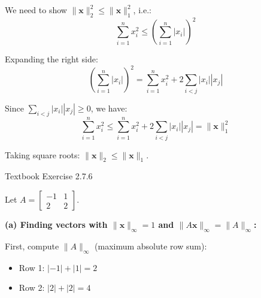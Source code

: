 \documentclass[reqno, answers]{exam}
\begin{document}
\begin{questions}
\begin{solution}
We need to show $\|\mathbf{x}\|_2^2 \leq \|\mathbf{x}\|_1^2$, i.e.:
\[
\sum_{i=1}^n x_i^2 \leq \left(\sum_{i=1}^n |x_i|\right)^2
\]

Expanding the right side:
\[
\left(\sum_{i=1}^n |x_i|\right)^2 = \sum_{i=1}^n x_i^2 + 2\sum_{i < j} |x_i||x_j|
\]

Since $\sum_{i < j} |x_i||x_j| \geq 0$, we have:
\[
\sum_{i=1}^n x_i^2 \leq \sum_{i=1}^n x_i^2 + 2\sum_{i < j} |x_i||x_j| = \|\mathbf{x}\|_1^2
\]

Taking square roots: $\|\mathbf{x}\|_2 \leq \|\mathbf{x}\|_1$.
\end{solution}

\question Textbook Exercise 2.7.6

Let $A = \begin{bmatrix} -1 & 1 \\ 2 & 2 \end{bmatrix}$.

\begin{solution}
\textbf{(a) Finding vectors with $\|\mathbf{x}\|_\infty = 1$ and $\|A\mathbf{x}\|_\infty = \|A\|_\infty$:}

First, compute $\|A\|_\infty$ (maximum absolute row sum):
\begin{itemize}
    \item Row 1: $|-1| + |1| = 2$
    \item Row 2: $|2| + |2| = 4$
\end{itemize}


\end{solution}
\end{questions}
\end{document}
